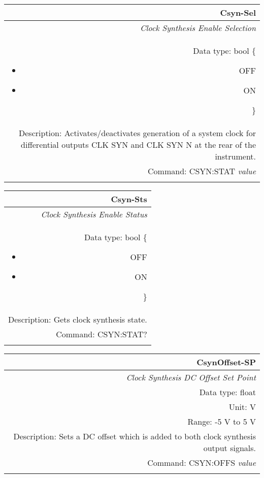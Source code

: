 \documentclass[openany]{article}
\begin{document}
		\begin{tabular}{N}
			\hline
			\bfseries Csyn-Sel \\ \hline
			\emph{Clock Synthesis Enable Selection} \\
			Data type: bool \{\begin{itemize}[noitemsep]
				\small
				\item[] OFF
				\item[] ON
			\end{itemize}\} \\
			Description: Activates/deactivates generation of a system clock for differential outputs CLK SYN and CLK SYN N at the rear of the instrument. \\
			Command: CSYN:STAT \emph{value} \\
			\\

		\end{tabular}


		\begin{tabular}{N}
			\hline
			\bfseries Csyn-Sts \\ \hline
			\emph{Clock Synthesis Enable Status} \\
			Data type: bool \{\begin{itemize}[noitemsep]
				\small
				\item[] OFF
				\item[] ON
			\end{itemize}\} \\
			Description: Gets clock synthesis state. \\
			Command: CSYN:STAT? \\
			\\
			
		\end{tabular}
%

		\begin{tabular}{N}
			\hline
			\bfseries CsynOffset-SP \\ \hline
			\emph{Clock Synthesis DC Offset Set Point} \\
			Data type: float \\
			Unit: V \\
			Range: -5 V to 5 V \\
			Description: Sets a DC offset which is added to both clock synthesis output signals. \\
			Command: CSYN:OFFS \emph{value} \\
			\\

		\end{tabular}
\end{document}
